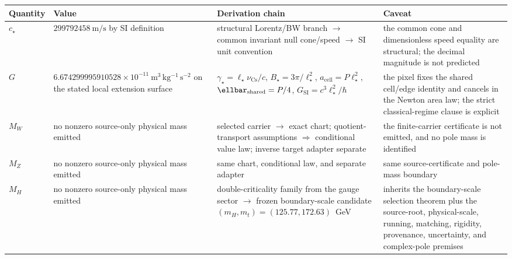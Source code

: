 {\centering
\scriptsize
\setlength{\tabcolsep}{3pt}
\begin{tabular}{@{}>{\raggedright\arraybackslash}p{}>{\raggedright\arraybackslash}p{}>{\raggedright\arraybackslash}p{}>{\raggedright\arraybackslash}p{}@{}}
\toprule
Quantity & Value & Derivation chain & Caveat \\
\midrule
\(c_\star\) & \(299792458~\mathrm{m/s}\) by SI definition & structural Lorentz/BW branch \(\rightarrow\) common invariant null cone/speed \(\rightarrow\) SI unit convention & the common cone and dimensionless speed equality are structural; the decimal magnitude is not predicted \\
\(G\) & \(6.674299995910528\times10^{-11}~\mathrm{m^3\,kg^{-1}\,s^{-2}}\) on the stated local extension surface & \(\gamma_\star=\ell_\star\nu_{\mathrm{Cs}}/c\), \(B_\star=3\pi/\ell_\star^2\), \(a_{\mathrm{cell}}=P\ell_\star^2\), \(\ellbar_{\mathrm{shared}}=P/4\), \(G_{\mathrm{SI}}=c^3\ell_\star^2/\hbar\) & the pixel fixes the shared cell/edge identity and cancels in the Newton area law; the strict classical-regime clause is explicit \\
\(M_W\) & no nonzero source-only physical mass emitted & selected carrier \(\rightarrow\) exact chart; quotient-transport assumptions \(\Rightarrow\) conditional value law; inverse target adapter separate & the finite-carrier certificate is not emitted, and no pole mass is identified \\
\(M_Z\) & no nonzero source-only physical mass emitted & same chart, conditional law, and separate adapter & same source-certificate and pole-mass boundary \\
\(M_H\) & no nonzero source-only physical mass emitted & double-criticality family from the gauge sector \(\rightarrow\) frozen boundary-scale candidate \((m_H,m_t)=(125.77,172.63)\)~GeV & inherits the boundary-scale selection theorem plus the source-root, physical-scale, running, matching, rigidity, provenance, uncertainty, and complex-pole premises \\
\bottomrule
\end{tabular}
\par}

